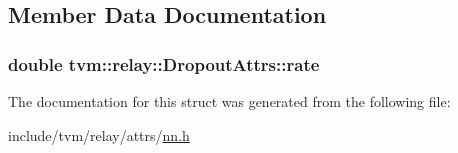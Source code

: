 \subsection{Member Data Documentation}
\subsubsection[{\texorpdfstring{rate}{rate}}]{\setlength{\rightskip}{0pt plus 5cm}double tvm\+::relay\+::\+Dropout\+Attrs\+::rate}\hypertarget{structtvm_1_1relay_1_1DropoutAttrs_a0b5a52c24a1be53dbb122a1df9fe22af}{}\label{structtvm_1_1relay_1_1DropoutAttrs_a0b5a52c24a1be53dbb122a1df9fe22af}


The documentation for this struct was generated from the following file\+:\begin{DoxyCompactItemize}
\item 
include/tvm/relay/attrs/\hyperlink{include_2tvm_2relay_2attrs_2nn_8h}{nn.\+h}\end{DoxyCompactItemize}
